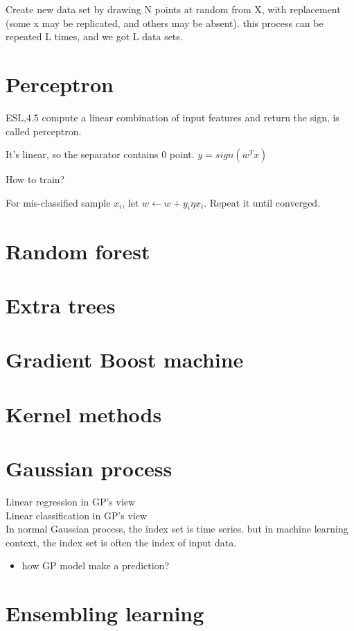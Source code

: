 \documentclass[10pt,a4paper]{book}
\begin{document}
Create new data set by drawing N points at random from X, with replacement (some x may be replicated, and others may be absent). this process can be repeated L times, and we got L data sets.
\section {Perceptron}
ESL,4.5
compute a linear combination of input features and return the sign, is called perceptron.

It's linear, so the separator contains 0 point. $y=sign(w^Tx)$

How to train?

For mis-classified sample $x_i$, let $w \leftarrow w + y_i \eta x_i$. Repeat it until converged. 

\section {Random forest}
\section {Extra trees}
\section {Gradient Boost machine}

\section {Kernel methods}

\section{Gaussian process}

Linear regression in GP's view
\\
Linear classification in GP's view
\\
In normal Gaussian process, the index set is time series. but in machine learning context, the index set is often the index of input data.

\begin{itemize}
	\item how GP model make a prediction?
\end{itemize}

\section {Ensembling learning}
\end{document}
